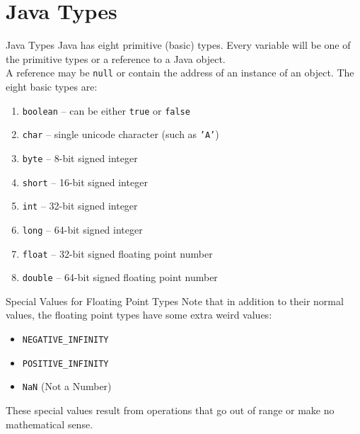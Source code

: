 \documentclass{beamer}
\begin{document}
\section{Java Types}

\begin{frame}{Java Types}
Java has eight primitive (basic) types. Every variable will be one of the primitive types or a reference to a Java object. \\
\vspace{0.5em}
A reference may be \texttt{null} or contain the address of an instance of an object. The eight basic types are:

\begin{enumerate}
\item \texttt{boolean} -- can be either \texttt{true} or \texttt{false}
\item \texttt{char} -- single unicode character (such as \texttt{'A'})
\item \texttt{byte} -- 8-bit signed integer
\item \texttt{short} -- 16-bit signed integer
\item \texttt{int} -- 32-bit signed integer
\item \texttt{long} -- 64-bit signed integer
\item \texttt{float} -- 32-bit signed floating point number
\item \texttt{double} -- 64-bit signed floating point number
\end{enumerate}
\end{frame}

\begin{frame}{Special Values for Floating Point Types}
Note that in addition to their normal values, the floating point types have some extra weird values: \\
\vspace{1em}
\begin{itemize}
\item \texttt{NEGATIVE\_INFINITY}
\item \texttt{POSITIVE\_INFINITY} 
\item \texttt{NaN} (Not a Number)
\end{itemize}
\vspace{1em}
These special values result from operations that go out of range or make no mathematical sense. \\
\end{frame}
\end{document}
